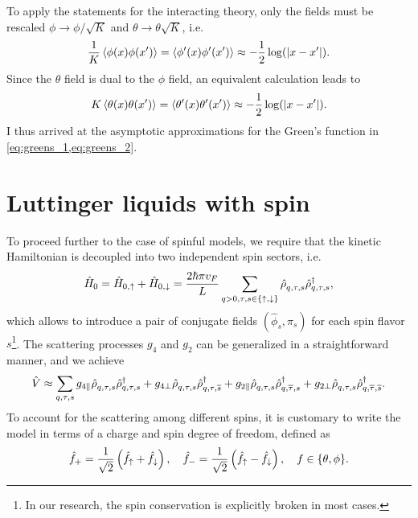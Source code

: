To apply the statements for the interacting theory, only the fields must be rescaled $\phi\rightarrow\phi/\sqrt K$ and $\theta\rightarrow\theta\sqrt K$, i.e.
\begin{align}
    \frac1K\braket{\phi(x)\phi(x')} = \braket{\phi'(x)\phi'(x')} \approx -\frac12\log(|x-x'|).
    \label{eq:greens_1}
\end{align}
Since the $\theta$ field is dual to the $\phi$ field, an equivalent calculation leads to
\begin{align}
    K\braket{\theta(x)\theta(x')} = \braket{\theta'(x)\theta'(x')} \approx -\frac12\log(|x-x'|).
    \label{eq:greens_2}
\end{align}
I thus arrived at the asymptotic approximations for the Green's function in \cref{eq:greens_1,eq:greens_2}.
%
%
\section{Luttinger liquids with spin}
\label{sec:LL_with_spin}
To proceed further to the case of spinful models, we require that the kinetic Hamiltonian is decoupled into two independent spin sectors, i.e.
\begin{align}
    \hat H_0 = \hat H_{0,\uparrow}+\hat H_{0,\downarrow}
    = \frac{2\hbar\pi v_F}L\sum_{q>0,\tau,s\in\{\uparrow,\downarrow\}}\hat\rho^\pdag_{q,\tau,s}\hat\rho^\dag_{q,\tau,s},
\end{align}
which allows to introduce a pair of conjugate fields $(\hat \phi_s,\hat \pi_s)$ for each spin flavor $s$\footnote{In our research, the spin conservation is explicitly broken in most cases.}.
The scattering processes $g_4$ and $g_2$ can be generalized in a straightforward manner, and we achieve
\begin{align}
  \hat V \approx
  \sum_{q,\tau,s}
  g_{4\parallel}\hat\rho^\pdag_{q,\tau,s}\hat\rho^\dag_{q,\tau,s}
  +
  g_{4\perp}\hat\rho^\pdag_{q,\tau,s}\hat\rho^\dag_{q,\tau,\overline s}
  +
  g_{2\parallel}\hat\rho^\pdag_{q,\tau,s}\hat\rho^\dag_{q,\overline\tau,s}
  +
  g_{2\perp}\hat\rho^\pdag_{q,\tau,s}\hat\rho^\dag_{q,\overline\tau,\overline s}.
\end{align}
To account for the scattering among different spins, it is customary to write the model in terms of a charge and spin degree of freedom, defined as
\begin{align}
    \hat f_+=\frac1{\sqrt2}\left( \hat f_\uparrow + \hat f_\downarrow \right),
    \quad
    \hat f_-=\frac1{\sqrt2}\left( \hat f_\uparrow - \hat f_\downarrow \right),
    \quad
    f\in\{\theta,\phi\}.
\end{align}

